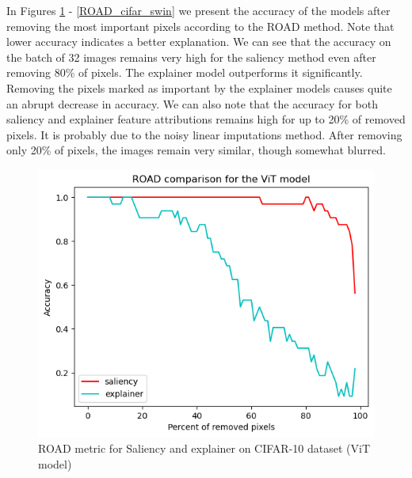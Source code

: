 \documentclass[magisterska,en]{pracamgr}
\begin{document}
In Figures \ref{ROAD_cifar_vit} - \ref{ROAD_cifar_swin} we present the accuracy of the models after removing the most important pixels according to the ROAD method. Note that lower accuracy indicates a better explanation. We can see that the accuracy on the batch of 32 images remains very high for the saliency method even after removing 80\% of pixels. The explainer model outperforms it significantly. Removing the pixels marked as important by the explainer models causes quite an abrupt decrease in accuracy. We can also note that the accuracy for both saliency and explainer feature attributions remains high for up to 20\% of removed pixels. It is probably due to the noisy linear imputations method. After removing only 20\% of pixels, the images remain very similar, though somewhat blurred.



\begin{figure}[H]
\centering
\includegraphics[scale=0.5]{./images/ROAD_cifar_vit.png}
\caption{ROAD metric for Saliency and explainer on CIFAR-10 dataset (ViT model)}
\label{ROAD_cifar_vit}
\end{figure}
\end{document}
